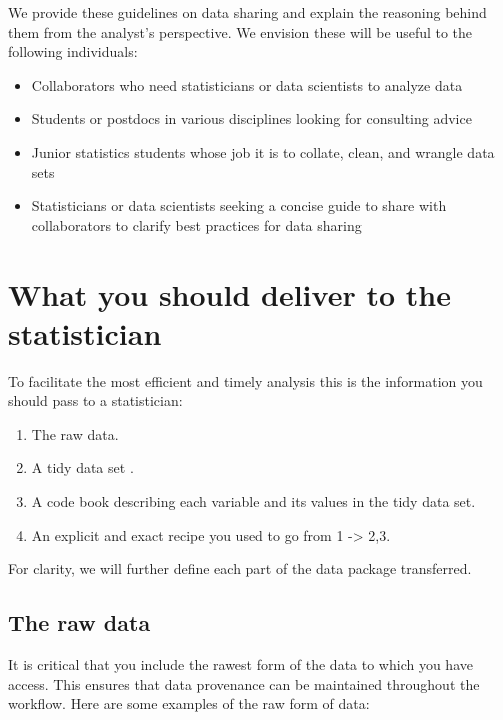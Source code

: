 \documentclass[12pt]{article}
\providecommand{\tightlist}{%
  \setlength{\itemsep}{0pt}\setlength{\parskip}{0pt}}
\begin{document}
We provide these guidelines on data sharing and explain the reasoning
behind them from the analyst's perspective. We envision these will be
useful to the following individuals:

\begin{itemize}
\tightlist
\item
  Collaborators who need statisticians or data scientists to analyze
  data
\item
  Students or postdocs in various disciplines looking for consulting
  advice
\item
  Junior statistics students whose job it is to collate, clean, and
  wrangle data sets
\item
  Statisticians or data scientists seeking a concise guide to share with
  collaborators to clarify best practices for data sharing
\end{itemize}

\section{What you should deliver to the
statistician}\label{what-you-should-deliver-to-the-statistician}

To facilitate the most efficient and timely analysis this is the
information you should pass to a statistician:

\begin{enumerate}
\def\labelenumi{\arabic{enumi}.}
\tightlist
\item
  The raw data.
\item
  A tidy data set \citep{_tidy_data}.
\item
  A code book describing each variable and its values in the tidy data
  set.
\item
  An explicit and exact recipe you used to go from 1 -\textgreater{}
  2,3.
\end{enumerate}

For clarity, we will further define each part of the data package
transferred.

\subsection{The raw data}
\label{sec:rawdata}

It is critical that you include the rawest form of the data to which you
have access. This ensures that data provenance can be maintained
throughout the workflow. Here are some examples of the raw form of data:
\end{document}
